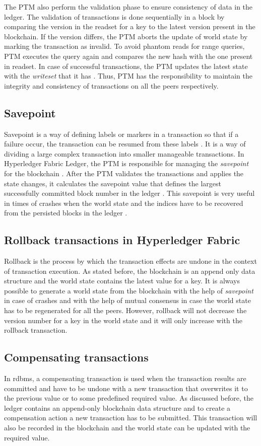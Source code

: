 \documentclass[
  a4paper,  %
  twoside,  %
  bibliography=totoc,
  headsepline,
  cleardoublepage=empty,
  parskip=half,
  draft=false
]{scrbook}
\begin{document}
The PTM also perform the validation phase to ensure consistency of data in the ledger. The validation of transactions is done sequentially in a block by comparing the version in the readset for a key to the latest version present in the blockchain. If the version differs, the PTM aborts the update of world state by marking the transaction as invalid. To avoid phantom reads for range queries, PTM executes the query again and compares the new hash with the one present in readset. In case of successful transactions, the PTM updates the latest state with the \textit{writeset} that it has \cite{HF}. Thus, PTM has the responsibility to maintain the integrity and consistency of transactions on all the peers respectively.

\subsection{Savepoint}
Savepoint is a way of defining labels or markers in a transaction so that if a failure occur, the transaction can be resumed from these labels \cite{sp}. It is a way of dividing a large complex transaction into smaller manageable transactions. In Hyperledger Fabric Ledger, the PTM is responsible for managing the \textit{savepoint} for the blockchain \cite{HF}. After the PTM validates the transactions and applies the state changes, it calculates the savepoint value that defines the largest successfully committed block number in the ledger \cite{HF}. This savepoint is very useful in times of crashes when the world state and the indices have to be recovered from the persisted blocks in the ledger \cite{HF}.

\subsection{Rollback transactions in Hyperledger Fabric}
Rollback is the process by which the transaction effects are undone in the context of transaction execution. As stated before, the blockchain is an append only data structure and the world state contains the latest value for a key. It is always possible to generate a world state from the blockchain with the help of \textit{savepoint} in case of crashes and with the help of mutual consensus in case the world state has to be regenerated for all the peers. However, rollback will not decrease the version number for a key in the world state and it will only increase with the rollback transaction.

\subsection{Compensating transactions}
In \gls{rdbms}, a compensating transaction is used when the transaction results are committed and have to be undone with a new transaction that overwrites it to the previous value or to some predefined required value. As discussed before, the ledger contains an append-only blockchain data structure and to create a compensation action a new transaction has to be submitted. This transaction will also be recorded in the blockchain and the world state can be updated with the required value.
\end{document}
